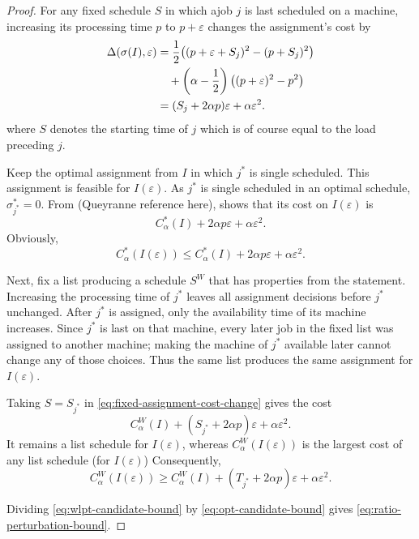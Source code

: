 \documentclass[11pt]{article}
\newcommand{\OptCost}{C_{\alpha}^{*}(I)}
\newcommand{\WorstCost}{C_{\alpha}^{W}(I)}
\begin{document}
\begin{proof}
For any fixed schedule $S$ in which  ajob $j$ is last scheduled on
a machine, increasing its processing time $p$ to
$p+\varepsilon$ changes the assignment's cost by
\begin{align}
    \Delta(\sigma(I),\varepsilon)
      &=
      \frac12\bigl((p+\varepsilon+S_{j})^2-(p+S_{j})^2\bigr)
      \notag\\
      &\quad+
      \left(\alpha-\frac12\right)
      \bigl((p+\varepsilon)^2-p^2\bigr)
      \notag\\
      &=(S_{j}+2\alpha p)\varepsilon+\alpha\varepsilon^2.
    \label{eq:fixed-assignment-cost-change}
\end{align}
where $S$ denotes the starting time of $j$ which is of course equal to the load preceding $j$. 


Keep the optimal assignment from $I$ in which $j^*$ is 
single scheduled. This assignment is feasible for $I(\varepsilon)$.
As $j^*$ is single scheduled in an optimal schedule, $\sigma^{*}_{j^*}=0$. From (Queyranne reference here), shows that
its cost on $I(\varepsilon)$ is
\[
    \OptCost+2\alpha p\varepsilon+\alpha\varepsilon^2.
\]
Obviously, 
\begin{equation}
    C_{\alpha}^{*}(I(\varepsilon))
    \leq
    \OptCost+2\alpha p\varepsilon+\alpha\varepsilon^2.
    \label{eq:opt-candidate-bound}
\end{equation}

Next, fix a list producing a schedule $S^W$ that has properties from the statement.
Increasing the processing time of $j^*$ leaves all assignment
decisions before $j^*$ unchanged.  After $j^*$ is assigned,
only the availability time of its machine increases.  Since
$j^*$ is last on that machine, every later job in the fixed list
was assigned to another machine; making the machine of $j^*$
available later cannot change any of those choices.  Thus the same
list produces the same assignment for $I(\varepsilon)$.

Taking $S=S_{j^*}$ in \eqref{eq:fixed-assignment-cost-change} gives the
cost
\[
    \WorstCost+(S_{j^*}+2\alpha p)\varepsilon
    +\alpha\varepsilon^2.
\]
It remains a list schedule for $I(\varepsilon)$, whereas
$C_{\alpha}^{W}(I(\varepsilon))$ is the largest cost of any list schedule (for $I(\varepsilon)$)
Consequently,
\begin{equation}
    C_{\alpha}^{W}(I(\varepsilon))
    \geq
    \WorstCost+(T_{j^*}+2\alpha p)\varepsilon
    +\alpha\varepsilon^2.
    \label{eq:wlpt-candidate-bound}
\end{equation}

Dividing \eqref{eq:wlpt-candidate-bound} by
\eqref{eq:opt-candidate-bound} gives
\eqref{eq:ratio-perturbation-bound}.
\end{proof}
\end{document}

